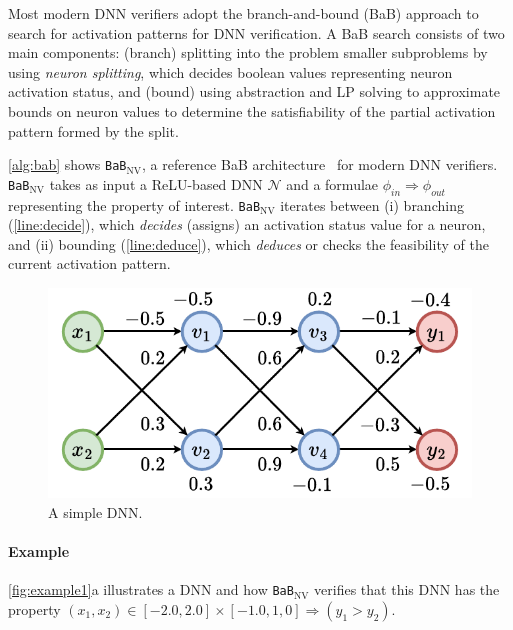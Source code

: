 \documentclass[oneside,11pt,dvipsnames]{book}
\newcommand{\prooflang}{\texttt{BaB$_{\text{ProofLang}}$}}
\newcommand{\bab}{\texttt{BaB$_{\text{NV}}$}}
\newcommand{\neuralsat}{\texttt{NeuralSAT}}
\begin{document}
Most modern DNN verifiers adopt the branch-and-bound (BaB) approach to search for activation patterns for DNN verification. A BaB search consists of two main components: (branch) splitting into the problem smaller subproblems 
by using \emph{neuron splitting}, which decides boolean values representing neuron activation status, 
and (bound) using abstraction and LP solving to approximate bounds on neuron values to determine 
the satisfiability of the partial activation pattern formed by the split.


\autoref{alg:bab} shows \bab{}, a reference BaB architecture~\cite{nakagawa2014consolidating} for modern DNN verifiers. \bab{} takes as input a ReLU-based DNN $\mathcal{N}$ and a formulae $\phi_{in}\Rightarrow \phi_{out}$ representing the property of interest.
\bab{} iterates between (i) branching (\autoref{line:decide}), which \emph{decides} (assigns) an activation status value for a neuron, and (ii) bounding (\autoref{line:deduce}), which \emph{deduces} or checks the feasibility of the current activation pattern. 




\begin{figure}[t]
    \centering
    \includegraphics[width=0.5\linewidth]{figure/proof_net.pdf}
    \caption{A simple DNN.}\label{fig:example1}
\end{figure}

\paragraph{Example} \autoref{fig:example1}a illustrates a DNN and how \bab{} verifies that this DNN has the property $(x_1, x_2) \in [-2.0, 2.0] \times [-1.0, 1,0] \Rightarrow (y_1 > y_2)$. 
\end{document}
